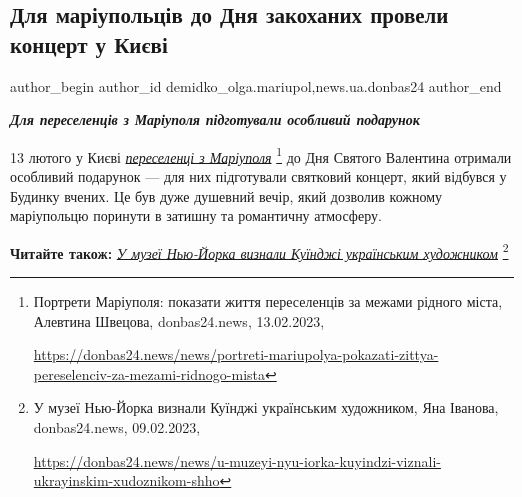  
 
 
 
 
 
\subsection{Для маріупольців до Дня закоханих провели концерт у Києві}
\label{sec:14_02_2023.stz.news.ua.donbas24.1.mrplci_den_zakohanyh_koncert_kyiv}
 
\ifcmt
 author_begin
   author_id demidko_olga.mariupol,news.ua.donbas24
 author_end
\fi


\begin{center}
  \em\color{blue}\bfseries\Large
  Для переселенців з Маріуполя підготували особливий подарунок
\end{center}

13 лютого у Києві \href{https://donbas24.news/news/portreti-mariupolya-pokazati-zittya-pereselenciv-za-mezami-ridnogo-mista}{\emph{переселенці з Маріуполя}}%
\footnote{Портрети Маріуполя: показати життя переселенців за межами рідного міста, Алевтина Швецова, donbas24.news, 13.02.2023, \par\url{https://donbas24.news/news/portreti-mariupolya-pokazati-zittya-pereselenciv-za-mezami-ridnogo-mista}}
до Дня Святого Валентина отримали особливий подарунок — для них підготували
святковий концерт, який відбувся у Будинку вчених. Це був дуже душевний вечір,
який дозволив кожному маріупольцю поринути в затишну та романтичну атмосферу.

\textbf{Читайте також:} \href{https://donbas24.news/news/u-muzeyi-nyu-iorka-kuyindzi-viznali-ukrayinskim-xudoznikom-shho}{\emph{У музеї Нью-Йорка визнали Куїнджі українським художником}}%
\footnote{У музеї Нью-Йорка визнали Куїнджі українським художником, Яна Іванова, donbas24.news, 09.02.2023, \par%
\url{https://donbas24.news/news/u-muzeyi-nyu-iorka-kuyindzi-viznali-ukrayinskim-xudoznikom-shho}%
}

